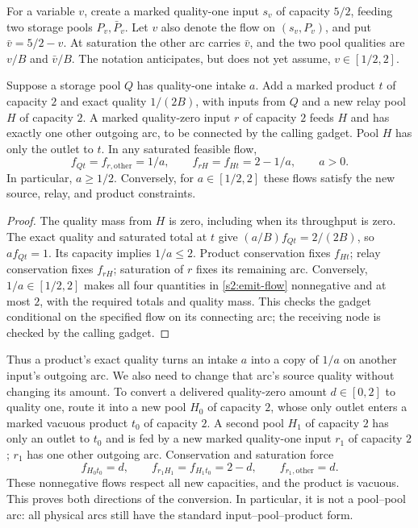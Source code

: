 For a variable $v$, create a marked quality-one input $s_v$ of capacity
$5/2$, feeding two storage pools $P_v,\bar P_v$. Let $v$ also denote
the flow on $(s_v,P_v)$, and put $\bar v=5/2-v$. At saturation the
other arc carries $\bar v$, and the two pool qualities are $v/B$ and
$\bar v/B$. The notation anticipates, but does not yet assume,
$v\in[1/2,2]$.

\begin{lemma}\label{s2:emission}
Suppose a storage pool $Q$ has quality-one intake $a$. Add a marked
product $t$ of capacity $2$ and exact quality $1/(2B)$, with inputs
from $Q$ and a new relay pool $H$ of capacity $2$. A marked quality-zero
input $r$ of capacity $2$ feeds $H$ and has exactly one other outgoing
arc, to be connected by the calling gadget. Pool $H$ has only the outlet
to $t$. In any saturated feasible flow,
\begin{equation}
 f_{Qt}=f_{r,\mathrm{other}}=1/a,\qquad
 f_{rH}=f_{Ht}=2-1/a,\qquad a>0.\label{s2:emit-flow}
\end{equation}
In particular, $a\ge1/2$. Conversely, for $a\in[1/2,2]$ these flows
satisfy the new source, relay, and product constraints.
\end{lemma}
\begin{proof}
The quality mass from $H$ is zero, including when its throughput is zero.
The exact quality and saturated total at $t$ give
$(a/B)f_{Qt}=2/(2B)$, so $af_{Qt}=1$.
Its capacity implies $1/a\le2$. Product conservation fixes $f_{Ht}$;
relay conservation fixes $f_{rH}$; saturation of $r$ fixes its remaining
arc. Conversely, $1/a\in[1/2,2]$ makes all four quantities in
\eqref{s2:emit-flow} nonnegative and at most $2$, with the required
totals and quality mass. This checks the gadget conditional on the
specified flow on its connecting arc; the receiving node is checked
by the calling gadget.
\end{proof}

Thus a product's exact quality turns an intake $a$ into a copy of $1/a$
on another input's outgoing arc. We also need to change that arc's source
quality without changing its amount. To convert a delivered quality-zero
amount $d\in[0,2]$ to quality one, route it into a new pool $H_0$ of
capacity $2$, whose only outlet enters a marked vacuous product $t_0$
of capacity $2$. A second pool $H_1$ of capacity $2$ has only an outlet
to $t_0$ and is fed by a new marked quality-one input $r_1$ of capacity
$2$; $r_1$ has one other outgoing arc. Conservation and saturation force
\begin{equation}
 f_{H_0t_0}=d,\qquad f_{r_1H_1}=f_{H_1t_0}=2-d,
 \qquad f_{r_1,\mathrm{other}}=d.\label{s2:flip}
\end{equation}
These nonnegative flows respect all new capacities, and the product is
vacuous. This proves both directions of the conversion. In particular,
it is not a pool--pool arc: all physical arcs still have the standard
input--pool--product form.

